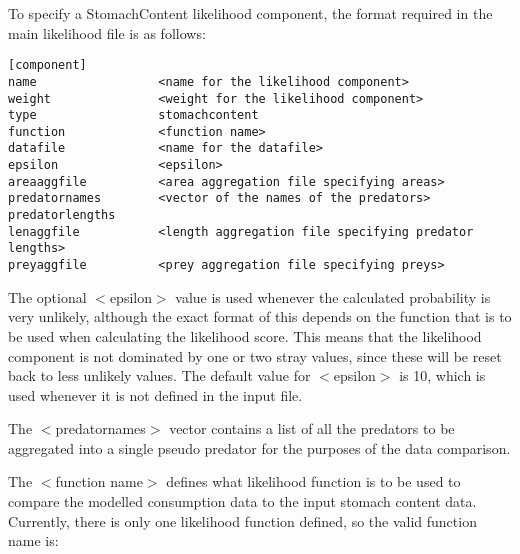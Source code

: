 \documentclass[10pt,twoside]{book}
\begin{document}
\bigskip
To specify a StomachContent likelihood component, the format required in the main likelihood file is as follows:

{\small\begin{verbatim}
[component]
name                 <name for the likelihood component>
weight               <weight for the likelihood component>
type                 stomachcontent
function             <function name>
datafile             <name for the datafile>
epsilon              <epsilon>
areaaggfile          <area aggregation file specifying areas>
predatornames        <vector of the names of the predators>
predatorlengths
lenaggfile           <length aggregation file specifying predator lengths>
preyaggfile          <prey aggregation file specifying preys>
\end{verbatim}}



The optional $<$epsilon$>$ value is used whenever the calculated probability is very unlikely, although the exact format of this depends on the function that is to be used when calculating the likelihood score.  This means that the likelihood component is not dominated by one or two stray values, since these will be reset back to less unlikely values.  The default value for $<$epsilon$>$ is 10, which is used whenever it is not defined in the input file.

\bigskip
The $<$predatornames$>$ vector contains a list of all the predators to be aggregated into a single pseudo predator for the purposes of the data comparison.

\bigskip
The $<$function name$>$ defines what likelihood function is to be used to compare the modelled consumption data to the input stomach content data.  Currently, there is only one likelihood function defined, so the valid function name is:
\end{document}

